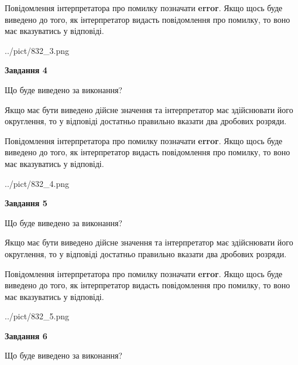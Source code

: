 \documentclass[12pt, ukrainian]{article}
\begin{document}
{\begin {Large}
Повідомлення інтерпретатора про помилку позначати \textbf{error}.
Якщо щось буде виведено до того, як інтерпретатор видасть повідомлення про помилку, 
то воно має вказуватись у відповіді. \par

\begin{center}
	{../pict/832_3.png}
\end{center}
\newpage

{\begin {center}\textbf{Завдання 4}\end {center}}\par
Що буде виведено за виконання? \par

Якщо має бути виведено дійсне значення та інтерпретатор має здійснювати його округлення, 
то у відповіді достатньо правильно вказати два дробових розряди.

Повідомлення інтерпретатора про помилку позначати \textbf{error}.
Якщо щось буде виведено до того, як інтерпретатор видасть повідомлення про помилку, 
то воно має вказуватись у відповіді. \par

\begin{center}
	{../pict/832_4.png}
\end{center}
\newpage

{\begin {center}\textbf{Завдання 5}\end {center}}\par
Що буде виведено за виконання? \par

Якщо має бути виведено дійсне значення та інтерпретатор має здійснювати його округлення, 
то у відповіді достатньо правильно вказати два дробових розряди.

Повідомлення інтерпретатора про помилку позначати \textbf{error}.
Якщо щось буде виведено до того, як інтерпретатор видасть повідомлення про помилку, 
то воно має вказуватись у відповіді. \par

\begin{center}
	{../pict/832_5.png}
\end{center}
\newpage

{\begin {center}\textbf{Завдання 6}\end {center}}\par
Що буде виведено за виконання? \par


\end{Large}}
\end{document}
